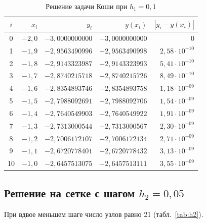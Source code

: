 \documentclass[14pt,a4paper]{extarticle}
\begin{document}
\begin{table}[H]
    \centering
    \caption{Решение задачи Коши при $h_1=0{,}1$}
    \label{tab:h1}
    \small
    \begin{tabular}{crrrr}
        \toprule
        $i$ & $x_i$ & $y_i$ & $y(x_i)$ & $|y_i-y(x_i)|$\\
        \midrule
        0  & $-2{,}0$ & $-3{,}0000000000$ & $-3{,}0000000000$ & 0\\
        1  & $-1{,}9$ & $-2{,}9563490996$ & $-2{,}9563490998$ & $2{,}58\cdot10^{-10}$\\
        2  & $-1{,}8$ & $-2{,}9143323987$ & $-2{,}9143323993$ & $5{,}41\cdot10^{-10}$\\
        3  & $-1{,}7$ & $-2{,}8740215718$ & $-2{,}8740215726$ & $8{,}49\cdot10^{-10}$\\
        4  & $-1{,}6$ & $-2{,}8354893746$ & $-2{,}8354893758$ & $1{,}18\cdot10^{-09}$\\
        5  & $-1{,}5$ & $-2{,}7988092691$ & $-2{,}7988092706$ & $1{,}54\cdot10^{-09}$\\
        6  & $-1{,}4$ & $-2{,}7640549903$ & $-2{,}7640549922$ & $1{,}91\cdot10^{-09}$\\
        7  & $-1{,}3$ & $-2{,}7313000544$ & $-2{,}7313000567$ & $2{,}30\cdot10^{-09}$\\
        8  & $-1{,}2$ & $-2{,}7006172107$ & $-2{,}7006172134$ & $2{,}71\cdot10^{-09}$\\
        9  & $-1{,}1$ & $-2{,}6720778401$ & $-2{,}6720778432$ & $3{,}13\cdot10^{-09}$\\
        10 & $-1{,}0$ & $-2{,}6457513075$ & $-2{,}6457513111$ & $3{,}55\cdot10^{-09}$\\
        \bottomrule
    \end{tabular}
\end{table}

\subsection{Решение на сетке с шагом $h_2=0{,}05$}

При вдвое меньшем шаге число узлов равно 21 (табл.~\ref{tab:h2}).
\end{document}
